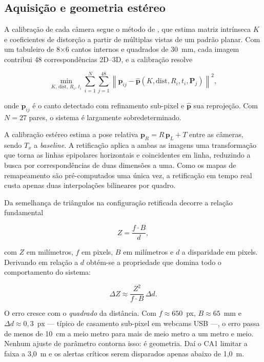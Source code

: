 \documentclass[12pt]{article}
\begin{document}
\subsection{Aquisição e geometria estéreo}

A calibração de cada câmera segue o método de \cite{zhang2000}, que estima
matriz intrínseca $K$ e coeficientes de distorção a partir de múltiplas vistas
de um padrão planar. Com um tabuleiro de 8$\times$6 cantos internos e
quadrados de 30~mm, cada imagem contribui 48 correspondências 2D--3D, e a
calibração resolve

\begin{equation}
\min_{K,\,\mathrm{dist},\,R_i,\,t_i}
\sum_{i=1}^{N} \sum_{j=1}^{48}
\left\| \mathbf{p}_{ij} - \hat{\mathbf{p}}(K,\mathrm{dist},R_i,t_i,\mathbf{P}_j) \right\|^2 ,
\end{equation}

onde $\mathbf{p}_{ij}$ é o canto detectado com refinamento sub-pixel e
$\hat{\mathbf{p}}$ sua reprojeção. Com $N = 27$ pares, o sistema é largamente
sobredeterminado.

A calibração estéreo estima a pose relativa $\mathbf{p}_R = R\,\mathbf{p}_L + T$
entre as câmeras, sendo $T_x$ a \textit{baseline}. A retificação aplica a
ambas as imagens uma transformação que torna as linhas epipolares
horizontais e coincidentes em linha, reduzindo a busca por correspondências de
duas dimensões a uma. Como os mapas de remapeamento são pré-computados uma
única vez, a retificação em tempo real custa apenas duas interpolações
bilineares por quadro.

Da semelhança de triângulos na configuração retificada decorre a relação
fundamental

\begin{equation}
Z = \frac{f \cdot B}{d},
\end{equation}

com $Z$ em milímetros, $f$ em pixels, $B$ em milímetros e $d$ a disparidade em
pixels. Derivando em relação a $d$ obtém-se a propriedade que domina todo o
comportamento do sistema:

\begin{equation}
\Delta Z \approx \frac{Z^{2}}{f \cdot B}\,\Delta d .
\end{equation}

O erro cresce com o \emph{quadrado} da distância. Com $f \approx 650$~px,
$B \approx 65$~mm e $\Delta d \approx 0{,}3$~px --- típico de casamento
sub-pixel em webcams USB ---, o erro passa de menos de 10~cm a meio metro para
mais de meio metro a um metro e meio. Nenhum ajuste de parâmetro contorna
isso: é geometria. Daí o CA1 limitar a faixa a 3,0~m e os alertas críticos
serem disparados apenas abaixo de 1,0~m.
\end{document}

